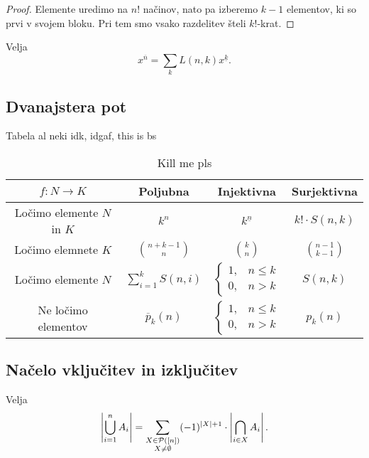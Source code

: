 \begin{proof}
Elemente uredimo na $n!$ načinov, nato pa izberemo $k-1$ elementov,
ki so prvi v svojem bloku. Pri tem smo vsako razdelitev šteli
$k!$-krat.
\end{proof}

\begin{izrek}
Velja
\[
x^{\overline{n}} = \sum_k L(n, k) x^{\underline{k}}.
\]
\end{izrek}

\newpage

\subsection{Dvanajstera pot}


\begin{izrek}
Tabela al neki idk, idgaf, this is bs
\begin{table}[!ht]
\centering
\caption{Kill me pls}
\begin{tabular}{|c|c|c|c|}
\hline 
$f \colon N \to K$ & Poljubna & Injektivna & Surjektivna \\ 
\hline 
Ločimo elemente $N$ in $K$ & $k^n$ & $k^{\underline{n}}$ & $k! \cdot S(n, k)$ \\ 
\hline 
Ločimo elemnete $K$ & $\binom{n+k-1}{n}$ & $\binom{k}{n}$ & $\binom{n-1}{k-1}$ \\ 
\hline 
Ločimo elemente $N$ & $\displaystyle\sum_{i=1}^k S(n, i)$ & $\begin{cases} 1, & n \leq k \\ 0, & n > k \end{cases}$ & $S(n, k)$ \\ 
\hline 
Ne ločimo elementov & $\overline{p}_k(n)$ & $\begin{cases} 1, & n \leq k \\ 0, & n > k \end{cases}$ & $p_k(n)$ \\ 
\hline 
\end{tabular} 
\end{table}
\end{izrek}

\obvs

\newpage

\subsection{Načelo vključitev in izključitev}

\begin{izrek}
Velja
\[
\left\lvert \bigcup_{i=1}^n A_i\right\rvert =
\sum_{\substack{X \in \mathcal{P}([n]) \\ X \ne \emptyset}}
(-1)^{\left\lvert X\right\rvert + 1} \cdot \left\lvert \bigcap_{i \in X} A_i\right\rvert.
\]
\end{izrek}

